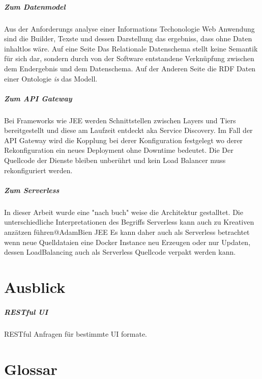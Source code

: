 \documentclass[
12pt,
english,
ngerman,
headsepline,
twoside,
openright,
numbers=noenddot,version=first
]{scrreprt}
\begin{document}
\paragraph{Zum Datenmodel}
Aus der Anforderungs analyse einer Informations Techonologie Web Anwendung sind die Builder, Texste und dessen Darstellung das ergebniss, dass ohne Daten inhaltlos wäre. Auf eine Seite Das Relationale Datenschema stellt keine Semantik für sich dar, sondern durch von der Software entstandene Verknüpfung zwischen dem Endergebnis und dem Datenschema. Auf der Anderen Seite die  RDF Daten einer Ontologie \textit{is} das Modell.

\paragraph{Zum API Gateway}
Bei Frameworks wie JEE werden Schnittstellen zwischen Layers und Tiers bereitgestellt und diese am Laufzeit entdeckt aka Service Discovery. 
Im Fall der API Gateway wird die Kopplung bei derer Konfiguration festgelegt wo derer Rekonfiguration ein neues Deployment ohne Downtime bedeutet. Die Der Quellcode der Dienste bleiben unberührt und kein Load Balancer muss rekonfiguriert werden. 


\paragraph{Zum Serverless}
In dieser Arbeit wurde eine "nach buch" weise die Architektur gestalltet. Die unterschiedliche Interpretationen des Begriffs Serverless kann auch zu Kreativen anzätzen führen@AdamBien JEE
Es kann daher auch als Serverless betrachtet wenn neue Quelldataien eine Docker Instance neu Erzeugen oder nur Updaten, dessen LoadBalancing auch als Serverless Quellcode verpakt werden kann. 

\chapter{Ausblick}

\paragraph{RESTful UI}
RESTful Anfragen für bestimmte UI formate.

\lstlistoflistings


\listoftables



\chapter*{Glossar}
\end{document}

